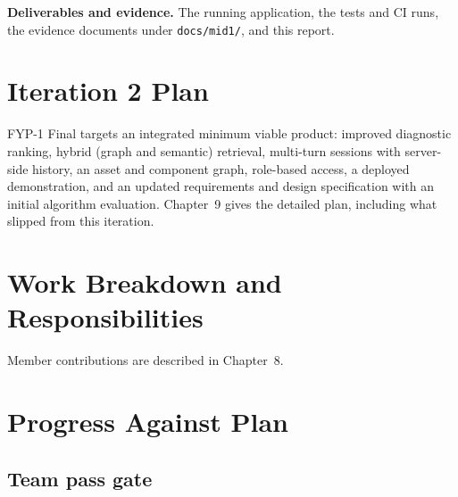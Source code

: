 \textbf{Deliverables and evidence.} The running application, the tests and CI runs, the evidence documents under \texttt{docs/mid1/}, and this report.

\section{Iteration 2 Plan}

FYP-1 Final targets an integrated minimum viable product: improved diagnostic ranking, hybrid (graph and semantic) retrieval, multi-turn sessions with server-side history, an asset and component graph, role-based access, a deployed demonstration, and an updated requirements and design specification with an initial algorithm evaluation. Chapter~9 gives the detailed plan, including what slipped from this iteration.

\section{Work Breakdown and Responsibilities}



Member contributions are described in Chapter~8.

\section{Progress Against Plan}



\subsection{Team pass gate}

